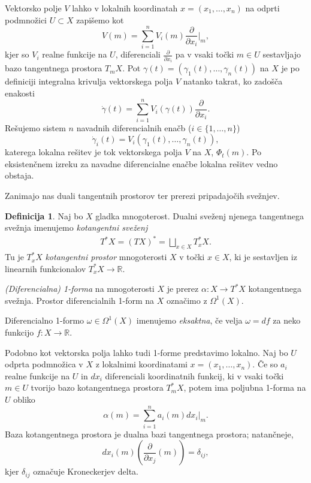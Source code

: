 \documentclass[12pt,a4paper,twoside]{article}
\theoremstyle{definition} %
\newtheorem{definicija}{Definicija}[section]
\theoremstyle{plain} %
\numberwithin{equation}{section}  %
\newcommand{\R}{\mathbb R}
\begin{document}
Vektorsko polje $V$ lahko v lokalnih koordinatah $x = (x_{1}, \dots, x_{n})$ na odprti podmnožici $U \subset X$ zapišemo kot 
\begin{equation}
V(m) = \sum_{i=1}^{n} V_{i}(m) \frac{\partial}{\partial x_{i}} \Big|_{m},
\end{equation}
kjer so $V_{i}$ realne funkcije na $U$, diferenciali $\frac{\partial}{\partial x_{i}}$ pa v vsaki točki $m \in U$ sestavljajo bazo tangentnega prostora $T_{m}X$.
Pot $\gamma (t) = (\gamma_{1}(t), \dots, \gamma_{n}(t))$ na $X$ je po definiciji integralna krivulja vektorskega polja $V$ natanko takrat, ko zadošča enakosti 
\begin{equation*}
\dot{\gamma}(t) = \sum_{i=1}^{n} V_{i}(\gamma(t)) \frac{\partial}{\partial x_{i}}.
\end{equation*}
Rešujemo sistem $n$ navadnih diferencialnih enačb ($i \in \{ 1, \dots , n \}$)
\begin{equation*}
\dot{\gamma}_{i}(t) = V_{i}(\gamma_{1}(t), \dots, \gamma_{n}(t)),
\end{equation*}
katerega lokalna rešitev je tok vektorskega polja $V$ na $X$, $\Phi_{t}(m)$. Po eksistenčnem izreku za navadne diferencialne enačbe lokalna rešitev vedno obstaja.

Zanimajo nas duali tangentnih prostorov ter prerezi pripadajočih svežnjev.

\begin{definicija}
Naj bo $X$ gladka mnogoterost. Dualni sveženj njenega tangentnega svežnja imenujemo \emph{kotangentni sveženj}
\begin{align}
T^{*}X = (TX)^{*} = \bigsqcup_{x \in X} T_{x}^{*}X.
\end{align}
Tu je $T_{x}^{*}X$ \emph{kotangentni prostor} mnogoterosti $X$ v točki $x \in X$, ki je sestavljen iz linearnih funkcionalov $T_{x}^{*}X \to \R$.

\emph{(Diferencialna) 1-forma} na mnogoterosti $X$ je prerez $\alpha \colon X \to T^{*}X$ kotangentnega svežnja. Prostor diferencialnih 1-form na $X$ označimo z $\Omega ^{1}(X)$.

Diferencialno 1-formo $\omega \in \Omega ^{1}(X)$ imenujemo \emph{eksaktna}, če velja $\omega = df$ za neko funkcijo $f \colon X \to \mathbb{R}$.
\end{definicija}

Podobno kot vektorska polja lahko tudi 1-forme predstavimo lokalno. Naj bo $U$ odprta podmnožica v $X$ z lokalnimi koordinatami $x = (x_{1}, \dots, x_{n})$. Če so $a_{i}$ realne funkcije na $U$ in $dx_{i}$ diferenciali koordinatnih funkcij, ki v vsaki točki $m \in U$ tvorijo bazo kotangentnega prostora $T_{m}^{*}X$, potem ima poljubna 1-forma na $U$ obliko
\begin{equation}
\alpha (m) = \sum_{i=1}^{n} a_{i}(m) dx_{i} \big|_{m}.
\end{equation}
Baza kotangentnega prostora je dualna bazi tangentnega prostora; natančneje, 
\begin{equation*}
dx_{i}(m) \left(\frac{\partial}{\partial x_{j}} (m) \right) = \delta _{ij},
\end{equation*}
kjer $\delta_{ij}$ označuje Kroneckerjev delta.
\end{document}
